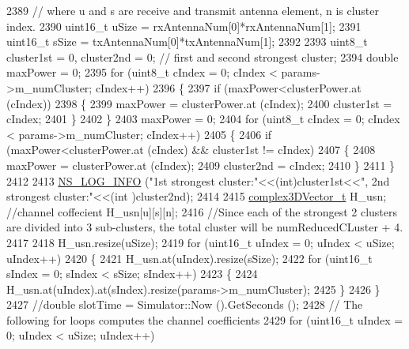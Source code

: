 \begin{DoxyCode}
2389                                                           \textcolor{comment}{// where u and s are receive and transmit antenna
       element, n is cluster index.}
2390         uint16\_t uSize = rxAntennaNum[0]*rxAntennaNum[1];
2391         uint16\_t sSize = txAntennaNum[0]*txAntennaNum[1];
2392 
2393         uint8\_t cluster1st = 0, cluster2nd = 0; \textcolor{comment}{// first and second strongest cluster;}
2394         \textcolor{keywordtype}{double} maxPower = 0;
2395         \textcolor{keywordflow}{for} (uint8\_t cIndex = 0; cIndex < params->m\_numCluster; cIndex++)
2396         \{
2397                 \textcolor{keywordflow}{if} (maxPower<clusterPower.at (cIndex))
2398                 \{
2399                         maxPower = clusterPower.at (cIndex);
2400                         cluster1st = cIndex;
2401                 \}
2402         \}
2403         maxPower = 0;
2404         \textcolor{keywordflow}{for} (uint8\_t cIndex = 0; cIndex < params->m\_numCluster; cIndex++)
2405         \{
2406                 \textcolor{keywordflow}{if} (maxPower<clusterPower.at (cIndex) && cluster1st != cIndex)
2407                 \{
2408                         maxPower = clusterPower.at (cIndex);
2409                         cluster2nd = cIndex;
2410                 \}
2411         \}
2412 
2413         \hyperlink{group__logging_gafbd73ee2cf9f26b319f49086d8e860fb}{NS\_LOG\_INFO} (\textcolor{stringliteral}{"1st strongest cluster:"}<<(\textcolor{keywordtype}{int})cluster1st<<\textcolor{stringliteral}{", 2nd strongest cluster:"}<<(\textcolor{keywordtype}{int}
      )cluster2nd);
2414 
2415         \hyperlink{namespacens3_afbc512ea4e4657e80b7ac44f78fc81ad}{complex3DVector\_t} H\_usn; \textcolor{comment}{//channel coffecient H\_usn[u][s][n];}
2416         \textcolor{comment}{//Since each of the strongest 2 clusters are divided into 3 sub-clusters, the total cluster will be
       numReducedCLuster + 4.}
2417 
2418         H\_usn.resize(uSize);
2419         \textcolor{keywordflow}{for} (uint16\_t uIndex = 0; uIndex < uSize; uIndex++)
2420         \{
2421                 H\_usn.at(uIndex).resize(sSize);
2422                 \textcolor{keywordflow}{for} (uint16\_t sIndex = 0; sIndex < sSize; sIndex++)
2423                 \{
2424                         H\_usn.at(uIndex).at(sIndex).resize(params->m\_numCluster);
2425                 \}
2426         \}
2427         \textcolor{comment}{//double slotTime = Simulator::Now ().GetSeconds ();}
2428         \textcolor{comment}{// The following for loops computes the channel coefficients}
2429         \textcolor{keywordflow}{for} (uint16\_t uIndex = 0; uIndex < uSize; uIndex++)

\end{DoxyCode}
